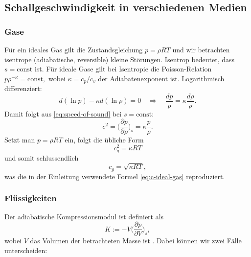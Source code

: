 \subsection{Schallgeschwindigkeit in verschiedenen Medien}

\subsubsection{Gase}
Für ein ideales Gas gilt die Zustandsgleichung
\(
    p=\rho R T
\)
und wir betrachten isentrope (adiabatische, reversible) kleine Störungen.
Isentrop bedeutet, dass \(s=\mathrm{const}\) ist.
Für ideale Gase gilt bei Isentropie die Poisson-Relation
\(
    p\rho^{-\kappa}=\mathrm{const},
\)
wobei \(\kappa=c_p/c_v\) der Adiabatenexponent ist.
Logarithmisch differenziert:
\[
    d(\ln p) - \kappa d(\ln \rho) = 0
    \quad\Rightarrow\quad
    \frac{dp}{p} = \kappa\frac{d\rho}{\rho}.
\]
Damit folgt aus \eqref{eq:speed-of-sound} bei \(s=\mathrm{const}\):
\[
 c^2
=
    \biggl(\frac{\partial p}{\partial \rho}\biggr)_{s}
    = \kappa\frac{p}{\rho}.
\]
Setzt man \(p=\rho R T\) ein, folgt die übliche Form
\[
    c_g^2 = \kappa R T
\]
und somit schlussendlich
\begin{equation*}
    c_g=\sqrt{\kappa R T},
\end{equation*}
was die in der Einleitung verwendete Formel \eqref{eq:c-ideal-gas} reproduziert.

\subsubsection{Flüssigkeiten}

Der adiabatische Kompressionsmodul ist definiert als
%
\begin{equation}
  K := -V\biggl(\frac{\partial p}{\partial V}\biggr)_{s},
  \label{eq:def-bulk}
\end{equation}
wobei $V$ das Volumen der betrachteten Masse ist \cite{schall:will}.
Dabei können wir zwei Fälle unterscheiden:

